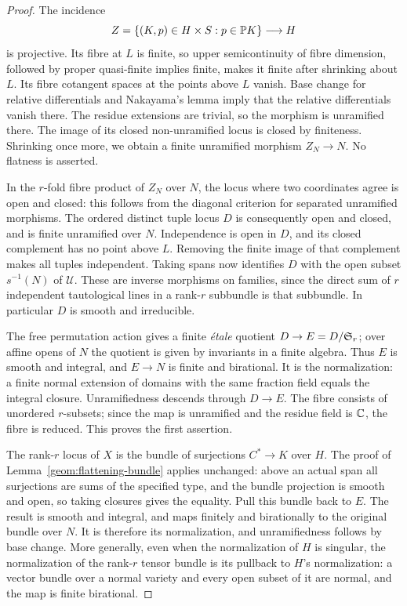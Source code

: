 \begin{proof}
The incidence
\[
 Z=\{(K,p)\in H\times S:p\in\mathbb P K\}\longrightarrow H
\]
is projective. Its fibre at $L$ is finite, so upper semicontinuity
of fibre dimension, followed by proper quasi-finite implies finite,
makes it finite after shrinking about $L$. Its fibre cotangent spaces
at the points above $L$ vanish. Base change for relative differentials
and Nakayama's lemma imply that the relative differentials vanish
there. The residue extensions are trivial, so the morphism is
unramified there. The image of its closed non-unramified locus is
closed by finiteness. Shrinking once more, we obtain a finite
unramified morphism $Z_N\to N$. No flatness is asserted.

In the $r$-fold fibre product of $Z_N$ over $N$, the locus where two
coordinates agree is open and closed: this follows from the diagonal
criterion for separated unramified morphisms. The ordered distinct
tuple locus $D$ is consequently open and closed, and is finite
unramified over $N$. Independence is open in $D$, and its closed
complement has no point above $L$. Removing the finite image of that
complement makes all tuples independent. Taking spans now identifies
$D$ with the open subset $s^{-1}(N)$ of $\mathcal U$. These are
inverse morphisms on families, since the direct sum of $r$ independent
tautological lines in a rank-$r$ subbundle is that subbundle.
In particular $D$ is smooth and irreducible.

The free permutation action gives a finite \emph{\'etale} quotient
$D\to E=D/\mathfrak S_r$; over affine opens of $N$ the quotient is given
by invariants in a finite algebra. Thus $E$ is smooth and integral,
and $E\to N$ is finite and birational. It is the normalization:
a finite normal extension of domains with the same fraction field
equals the integral closure. Unramifiedness descends through
$D\to E$. The fibre consists of unordered $r$-subsets; since the
map is unramified and the residue field is $\mathbb C$, the fibre is
reduced. This proves the first assertion.

The rank-$r$ locus of $X$ is the bundle of surjections $C^*\to K$
over $H$. The proof of Lemma~\ref{geom:flattening-bundle} applies
unchanged: above an actual span all surjections are sums of the
specified type, and the bundle projection is smooth and open, so
taking closures gives the equality. Pull this bundle back to $E$.
The result is smooth and integral, and maps finitely and
birationally to the original bundle over $N$. It is therefore its
normalization, and unramifiedness follows by base change. More
generally, even when the normalization of $H$ is singular, the
normalization of the rank-$r$ tensor bundle is its pullback to
$H$'s normalization: a vector bundle over a normal variety and
every open subset of it are normal, and the map is finite
birational.
\end{proof}

